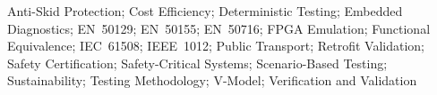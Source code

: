 Anti-Skid Protection; Cost Efficiency; Deterministic Testing; Embedded Diagnostics; EN~50129; EN~50155; EN~50716; FPGA Emulation; Functional Equivalence; IEC~61508; IEEE~1012; Public Transport; Retrofit Validation; Safety Certification; Safety-Critical Systems; Scenario-Based Testing; Sustainability; Testing Methodology; V-Model; Verification and Validation
